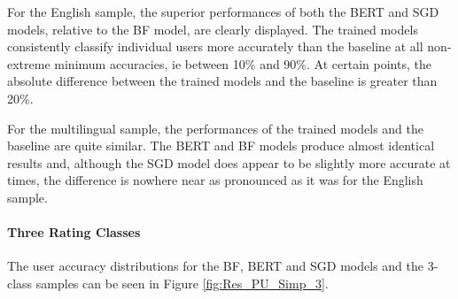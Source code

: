 For the English sample, the superior performances of both the BERT and SGD models, relative to the BF model, are clearly displayed. The trained models consistently classify individual users more accurately than the baseline at all non-extreme minimum accuracies, ie between 10\% and 90\%. At certain points, the absolute difference between the trained models and the baseline is greater than 20\%.

For the multilingual sample, the performances of the trained models and the baseline are quite similar. The BERT and BF models produce almost identical results and, although the SGD model does appear to be slightly more accurate at times, the difference is nowhere near as pronounced as it was for the English sample.

\paragraph{Three Rating Classes}

The user accuracy distributions for the BF, BERT and SGD models and the 3-class samples can be seen in Figure \ref{fig:Res_PU_Simp_3}.

